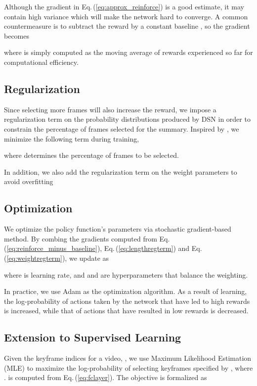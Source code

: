 \documentclass[letterpaper]{article} \usepackage{aaai18}  \usepackage{times}  \usepackage{helvet}  \usepackage{courier}  \usepackage{url}  \usepackage{graphicx}
\begin{document}
Although the gradient in Eq.\,(\ref{eq:approx_reinforce}) is a good estimate, it may contain high variance which will make the network hard to converge. A common countermeasure is to subtract the reward by a constant baseline , so the gradient becomes

where  is simply computed as the moving average of rewards experienced so far for computational efficiency.

\subsection{Regularization}
Since selecting more frames will also increase the reward, we impose a regularization term on the probability distributions  produced by DSN in order to constrain the percentage of frames selected for the summary. Inspired by \cite{mahasseniunsupervised}, we minimize the following term during training,

where  determines the percentage of frames to be selected.

In addition, we also add the  regularization term on the weight parameters  to avoid overfitting


\subsection{Optimization}
We optimize the policy function's parameters  via stochastic gradient-based method. By combing the gradients computed from Eq.\,(\ref{eq:reinforce_minus_baseline}), Eq.\,(\ref{eq:lengthregterm}) and Eq.\,(\ref{eq:weightregterm}), we update  as

where  is learning rate, and  and  are hyperparameters that balance the weighting.

In practice, we use Adam \cite{kingma2014adam} as the optimization algorithm. As a result of learning, the log-probability of actions taken by the network that have led to high rewards is increased, while that of actions that have resulted in low rewards is decreased.

\subsection{Extension to Supervised Learning}
Given the keyframe indices for a video, , we use Maximum Likelihood Estimation (MLE) to maximize the log-probability of selecting keyframes specified by ,  where .  is computed from Eq.\,(\ref{eq:fclayer}). The objective is formalized as
\end{document}
